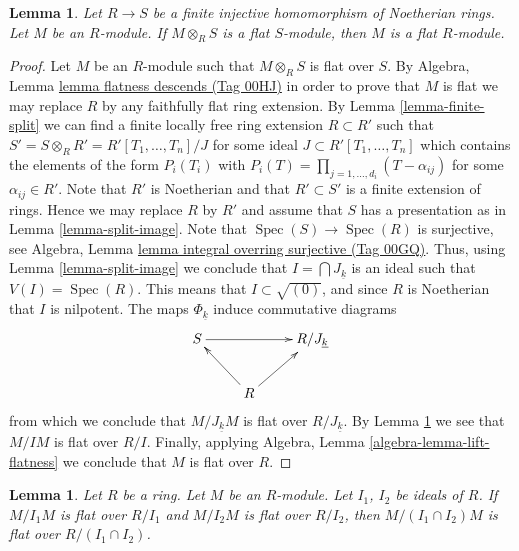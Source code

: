 \documentclass{amsart}
\theoremstyle{plain}
\newtheorem{lemma}[subsection]{Lemma}
\theoremstyle{definition}
\theoremstyle{remark}
\numberwithin{equation}{subsection}
\def\Spec{\mathop{\mathrm{Spec}}}
\begin{document}
\begin{lemma}
\label{lemma-descent-flatness-injective-finite-Noetherian-rings}
Let $R \to S$ be a finite injective homomorphism of Noetherian rings.
Let $M$ be an $R$-module. If $M \otimes_R S$ is a flat $S$-module,
then $M$ is a flat $R$-module.
\end{lemma}

\begin{proof}
Let $M$ be an $R$-module such that $M \otimes_R S$ is flat over $S$. By
Algebra, Lemma \href{https://stacks.math.columbia.edu/tag/00HJ}{lemma flatness descends (Tag 00HJ)}
in order to prove that $M$ is flat we may replace $R$ by any faithfully flat
ring extension. By
Lemma \ref{lemma-finite-split}
we can find a finite locally free ring extension $R \subset R'$ such
that $S' = S \otimes_R R' = R'[T_1, \ldots, T_n]/J$ for some ideal
$J \subset R'[T_1, \ldots, T_n]$ which contains the  elements of the form
$P_i(T_i)$ with $P_i(T) = \prod_{j = 1, \ldots, d_i} (T - \alpha_{ij})$
for some $\alpha_{ij} \in R'$. Note that $R'$ is Noetherian
and that $R' \subset S'$ is a finite extension of rings. Hence we may
replace $R$ by $R'$ and assume that $S$ has a presentation as in
Lemma \ref{lemma-split-image}.
Note that $\Spec(S) \to \Spec(R)$ is surjective, see
Algebra, Lemma \href{https://stacks.math.columbia.edu/tag/00GQ}{lemma integral overring surjective (Tag 00GQ)}.
Thus, using
Lemma \ref{lemma-split-image}
we conclude that $I = \bigcap J_{\underline{k}}$ is an ideal
such that $V(I) = \Spec(R)$. This means that
$I \subset \sqrt{(0)}$, and since $R$ is Noetherian that $I$
is nilpotent. The maps $\Phi_{\underline{k}}$ induce commutative
diagrams
$$
\xymatrix{
S \ar[rr] & & R/J_{\underline{k}} \\
& R \ar[lu] \ar[ru]
}
$$
from which we conclude that $M/J_{\underline{k}}M$ is flat over
$R/J_{\underline{k}}$. By
Lemma \ref{lemma-intersection-flat}
we see that $M/IM$ is flat over $R/I$. Finally, applying
Algebra, Lemma \ref{algebra-lemma-lift-flatness}
we conclude that $M$ is flat over $R$.
\end{proof}


\begin{lemma}
\label{lemma-intersection-flat}
Let $R$ be a ring. Let $M$ be an $R$-module. Let $I_1$, $I_2$ be ideals of $R$.
If $M/I_1M$ is flat over $R/I_1$ and $M/I_2M$ is flat over $R/I_2$,
then $M/(I_1 \cap I_2)M$ is flat over $R/(I_1 \cap I_2)$.
\end{lemma}
\end{document}
